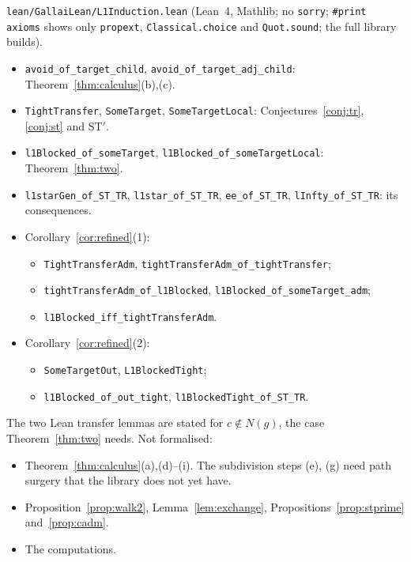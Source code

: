 \documentclass[11pt]{amsart}
\theoremstyle{definition}
\newcommand{\ST}{\mathrm{ST}}
\begin{document}
\texttt{lean/GallaiLean/L1Induction.lean} (Lean~4, Mathlib; no \texttt{sorry}; \texttt{\#print axioms}
shows only \texttt{propext}, \texttt{Classical.choice} and \texttt{Quot.sound}; the full library
builds).
\begin{itemize}
\item \texttt{avoid\_of\_target\_child}, \texttt{avoid\_of\_target\_adj\_child}:
Theorem~\ref{thm:calculus}(b),(c).
\item \texttt{TightTransfer}, \texttt{SomeTarget}, \texttt{SomeTargetLocal}:
Conjectures~\ref{conj:tr}, \ref{conj:st} and $\ST'$.
\item \texttt{l1Blocked\_of\_someTarget}, \texttt{l1Blocked\_of\_someTargetLocal}: Theorem~\ref{thm:two}.
\item \texttt{l1starGen\_of\_ST\_TR}, \texttt{l1star\_of\_ST\_TR}, \texttt{ee\_of\_ST\_TR},
\texttt{lInfty\_of\_ST\_TR}: its consequences.
\item Corollary~\ref{cor:refined}(1):
  \begin{itemize}
  \item \texttt{TightTransferAdm}, \texttt{tightTransferAdm\_of\_tightTransfer};
  \item \texttt{tightTransferAdm\_of\_l1Blocked}, \texttt{l1Blocked\_of\_someTarget\_adm};
  \item \texttt{l1Blocked\_iff\_tightTransferAdm}.
  \end{itemize}
\item Corollary~\ref{cor:refined}(2):
  \begin{itemize}
  \item \texttt{SomeTargetOut}, \texttt{L1BlockedTight};
  \item \texttt{l1Blocked\_of\_out\_tight}, \texttt{l1BlockedTight\_of\_ST\_TR}.
  \end{itemize}
\end{itemize}
The two Lean transfer lemmas are stated for $c\notin N(g)$, the case Theorem~\ref{thm:two} needs.
Not formalised:
\begin{itemize}
\item Theorem~\ref{thm:calculus}(a),(d)--(i). The subdivision steps (e), (g) need path surgery that
the library does not yet have.
\item Proposition~\ref{prop:walk2}, Lemma~\ref{lem:exchange}, Propositions~\ref{prop:stprime}
and~\ref{prop:cadm}.
\item The computations.
\end{itemize}
\end{document}

